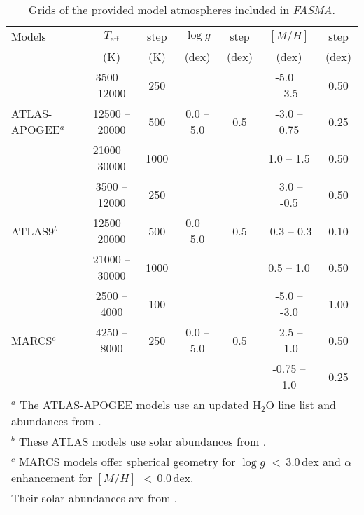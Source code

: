 \documentclass[fleqn,usenatbib]{mnras}
\begin{document}
\begin{table*}
\begin{center}
\caption{Grids of the provided model atmospheres included in \textit{FASMA}.}
\label{model_table}
\end{center}
\begin{tabular}{lcccccc}
\hline\hline
Models       & $T_{\mathrm{eff}}$ & step & $\log g$ & step  & $[M/H]$ & step \\
             & (K)                & (K)  & (dex)    & (dex) & (dex)   & (dex) \\
\hline
\multirow{3}{*}{ATLAS-APOGEE$^a$} & 3500  -- 12000  & 250  &            &     & -5.0 -- -3.5 & 0.50 \\
                                  & 12500 -- 20000  & 500  & 0.0 -- 5.0 & 0.5 & -3.0 -- 0.75 & 0.25 \\  
                                  & 21000 -- 30000  & 1000 &            &     &  1.0 -- 1.5  & 0.50 \\ 
\hline
\multirow{3}{*}{ATLAS9$^b$}       & 3500 --  12000  & 250  &            &     & -3.0 -- -0.5 & 0.50 \\
                                  & 12500 -- 20000  & 500  & 0.0 -- 5.0 & 0.5 & -0.3 -- 0.3  & 0.10 \\  
                                  & 21000 -- 30000  & 1000 &            &     &  0.5 -- 1.0  & 0.50 \\ 
\hline
\multirow{3}{*}{MARCS$^c$}        & 2500 --  4000   & 100  &            &     & -5.0 -- -3.0 & 1.00 \\
                                  & 4250 --  8000   & 250  & 0.0 -- 5.0 & 0.5 & -2.5 -- -1.0 & 0.50 \\ 
                                  &                 &      &            &     & -0.75 -- 1.0 & 0.25 \\ 
\hline
\multicolumn{7}{l}{$^a$ The ATLAS-APOGEE models use an updated H$_{2}$O line list and abundances from \cite{asplund2005}.} \\
\multicolumn{7}{l}{$^b$ These ATLAS models use solar abundances from \cite{Anders1989}.} \\
\multicolumn{7}{l}{$^c$ MARCS models offer spherical geometry for $\log g$ $<$\,3.0\,dex and $\alpha$ enhancement for $[M/H]$ $<$\,0.0\,dex.} \\ 
\multicolumn{7}{l}{Their solar abundances are from \cite{Grevesse2007}.}
\end{tabular}
\end{table*}
\end{document}
